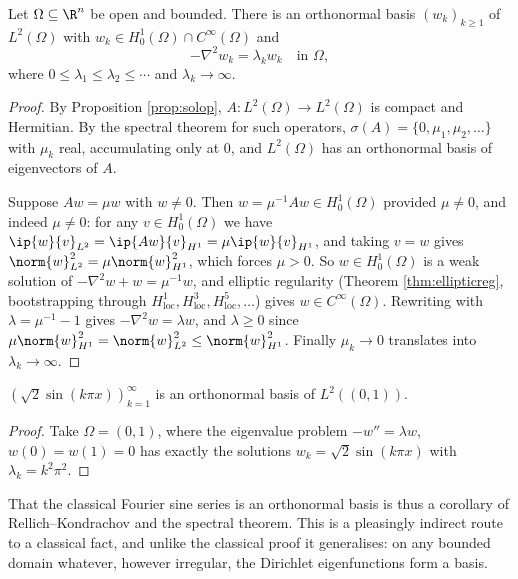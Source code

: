 \begin{theorem}\label{thm:eigenvalues}
	Let $\Omega\subseteq\R^n$ be open and bounded. There is an orthonormal basis $(w_k)_{k\ge1}$ of $L^2(\Omega)$ with $w_k \in H_0^1(\Omega)\cap C^\infty(\Omega)$ and
	$$-\nabla^2w_k=\lambda_kw_k \quad\text{in }\Omega,$$
	where $0\le\lambda_1\le\lambda_2\le\cdots$ and $\lambda_k\to\infty$.
\end{theorem}

\begin{proof}
	By Proposition \ref{prop:solop}, $A : L^2(\Omega)\to L^2(\Omega)$ is compact and Hermitian. By the spectral theorem for such operators, $\sigma(A)=\{0,\mu_1,\mu_2,\dots\}$ with $\mu_k$ real, accumulating only at $0$, and $L^2(\Omega)$ has an orthonormal basis of eigenvectors of $A$.

	Suppose $Aw = \mu w$ with $w \ne 0$. Then $w = \mu^{-1}Aw \in H_0^1(\Omega)$ provided $\mu \ne 0$, and indeed $\mu \ne 0$: for any $v \in H_0^1(\Omega)$ we have $\ip{w}{v}_{L^2}=\ip{Aw}{v}_{H^1}=\mu\ip{w}{v}_{H^1}$, and taking $v = w$ gives $\norm{w}_{L^2}^2=\mu\norm{w}^2_{H^1}$, which forces $\mu > 0$. So $w \in H_0^1(\Omega)$ is a weak solution of $-\nabla^2w+w=\mu^{-1}w$, and elliptic regularity (Theorem \ref{thm:ellipticreg}, bootstrapping through $H^1_{\mathrm{loc}}, H^3_{\mathrm{loc}}, H^5_{\mathrm{loc}},\dots$) gives $w \in C^\infty(\Omega)$. Rewriting with $\lambda = \mu^{-1}-1$ gives $-\nabla^2w=\lambda w$, and $\lambda \ge 0$ since $\mu\norm{w}_{H^1}^2 = \norm{w}_{L^2}^2 \le \norm{w}^2_{H^1}$. Finally $\mu_k \to 0$ translates into $\lambda_k\to\infty$.
\end{proof}

\begin{corollary}
	$\left(\sqrt2\sin(k\pi x)\right)_{k=1}^\infty$ is an orthonormal basis of $L^2((0,1))$.
\end{corollary}

\begin{proof}
	Take $\Omega = (0,1)$, where the eigenvalue problem $-w''=\lambda w$, $w(0)=w(1)=0$ has exactly the solutions $w_k=\sqrt2\sin(k\pi x)$ with $\lambda_k=k^2\pi^2$.
\end{proof}

That the classical Fourier sine series is an orthonormal basis is thus a corollary of Rellich--Kondrachov and the spectral theorem. This is a pleasingly indirect route to a classical fact, and unlike the classical proof it generalises: on any bounded domain whatever, however irregular, the Dirichlet eigenfunctions form a basis.


